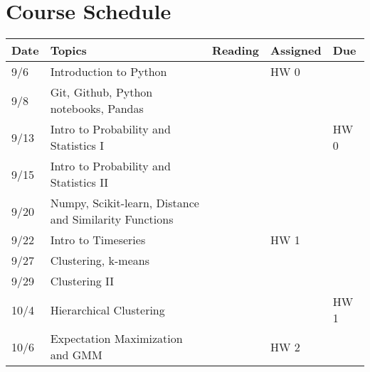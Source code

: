 \documentclass[11pt]{article}
\begin{document}
\newpage
\section*{Course Schedule}

\small
\begin{centering}
\begin{tabular}{||l|p{3in}|l|l|l||}
\hline\hline
Date & Topics  & Reading & Assigned & Due  \\
\hline\hline
9/6 & Introduction to Python &  &  HW 0 & \\
9/8 & Git, Github, Python notebooks, Pandas & & & \\

\hline
9/13 & Intro to Probability and Statistics I & &  & HW 0 \\
9/15 & Intro to Probability and Statistics II & & & \\
\hline

 9/20 & Numpy, Scikit-learn, Distance and Similarity Functions & &  & \\
9/22 & Intro to Timeseries & & HW 1 & \\ 
\hline

9/27 & Clustering, k-means & & & \\
9/29 & Clustering II & & & \\ 
\hline

10/4 & Hierarchical Clustering & & & HW 1 \\  
10/6 & Expectation Maximization and GMM & & HW 2 & \\ 
\hline


\end{tabular}
\end{centering}
\end{document}
